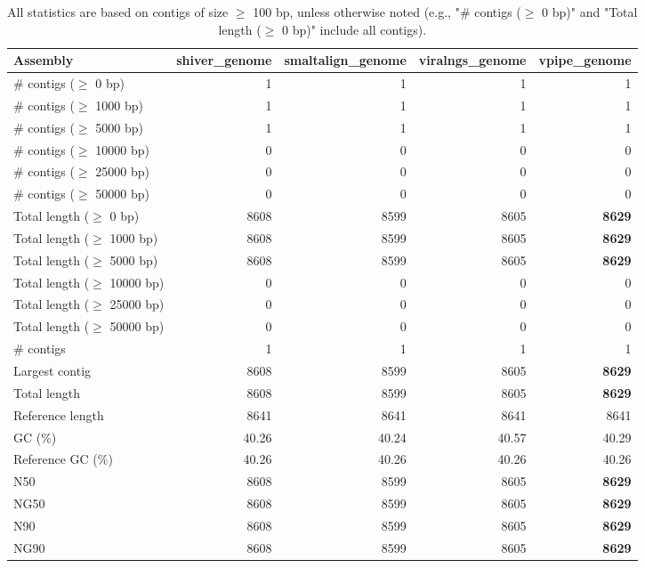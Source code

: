 \documentclass[12pt,a4paper]{article}
\begin{document}
\begin{table}[ht]
\begin{center}
\caption{All statistics are based on contigs of size $\geq$ 100 bp, unless otherwise noted (e.g., "\# contigs ($\geq$ 0 bp)" and "Total length ($\geq$ 0 bp)" include all contigs).}
\begin{tabular}{|l*{4}{|r}|}
\hline
Assembly & shiver\_genome & smaltalign\_genome & viralngs\_genome & vpipe\_genome \\ \hline
\# contigs ($\geq$ 0 bp) & 1 & 1 & 1 & 1 \\ \hline
\# contigs ($\geq$ 1000 bp) & 1 & 1 & 1 & 1 \\ \hline
\# contigs ($\geq$ 5000 bp) & 1 & 1 & 1 & 1 \\ \hline
\# contigs ($\geq$ 10000 bp) & 0 & 0 & 0 & 0 \\ \hline
\# contigs ($\geq$ 25000 bp) & 0 & 0 & 0 & 0 \\ \hline
\# contigs ($\geq$ 50000 bp) & 0 & 0 & 0 & 0 \\ \hline
Total length ($\geq$ 0 bp) & 8608 & 8599 & 8605 & {\bf 8629} \\ \hline
Total length ($\geq$ 1000 bp) & 8608 & 8599 & 8605 & {\bf 8629} \\ \hline
Total length ($\geq$ 5000 bp) & 8608 & 8599 & 8605 & {\bf 8629} \\ \hline
Total length ($\geq$ 10000 bp) & 0 & 0 & 0 & 0 \\ \hline
Total length ($\geq$ 25000 bp) & 0 & 0 & 0 & 0 \\ \hline
Total length ($\geq$ 50000 bp) & 0 & 0 & 0 & 0 \\ \hline
\# contigs & 1 & 1 & 1 & 1 \\ \hline
Largest contig & 8608 & 8599 & 8605 & {\bf 8629} \\ \hline
Total length & 8608 & 8599 & 8605 & {\bf 8629} \\ \hline
Reference length & 8641 & 8641 & 8641 & 8641 \\ \hline
GC (\%) & 40.26 & 40.24 & 40.57 & 40.29 \\ \hline
Reference GC (\%) & 40.26 & 40.26 & 40.26 & 40.26 \\ \hline
N50 & 8608 & 8599 & 8605 & {\bf 8629} \\ \hline
NG50 & 8608 & 8599 & 8605 & {\bf 8629} \\ \hline
N90 & 8608 & 8599 & 8605 & {\bf 8629} \\ \hline
NG90 & 8608 & 8599 & 8605 & {\bf 8629} \\ \hline

\end{tabular}
\end{center}
\end{table}
\end{document}
